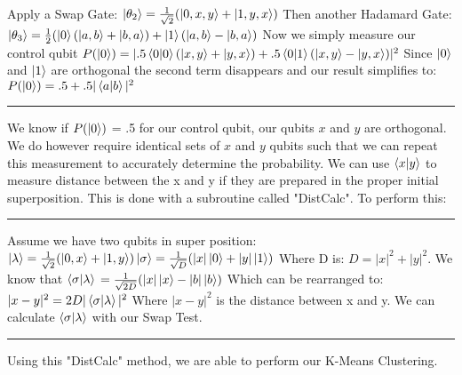 \documentclass[conference]{IEEEtran}
\begin{document}
   Apply a Swap Gate: \newline 
 $  \ket{\theta_2} = \frac{1}{\sqrt{2}}(\ket{0,x,y}+ \ket{1,y,x}) $ \newline \newline
   Then another Hadamard Gate: \newline 
 $  \ket{\theta_3} = \frac{1}{2}(\ket{0}(\ket{a,b}+\ket{b,a}) + \ket{1}(\ket{a,b}-\ket{b,a}) $ \newline \newline
 Now we simply measure our control qubit \newline
 $P(\ket{0}) =|.5 \bra{0}\ket{0}(\ket{x,y} + \ket{y,x}) + .5\bra{0}\ket{1}(\ket{x,y}-\ket{y,x})|^2$  Since $\ket{0}$ and $\ket{1}$ are orthogonal the second term disappears and our result simplifies to: \newline
 $P(\ket{0}) = .5 + .5|\bra{a}\ket{b}|^2$ \newline
\noindent\rule{\columnwidth}{1pt}
\indent We know if $P(\ket{0})$ = .5 for our control qubit, our qubits $x$ and $y$ are orthogonal. We do however require identical sets of $x$ and $y$ qubits such that we can repeat this measurement to accurately determine the probability. We can use $\bra{x}\ket{y}$ to measure distance between the x and y if they are prepared in the proper initial superposition. This is done with a subroutine called "DistCalc". To perform this: 
\noindent\rule{\columnwidth}{1pt}
Assume we have two qubits in super position:
$
\ket{\lambda} = \frac{1}{\sqrt{2}}(\ket{0,x} + \ket{1,y}) \\
\ket{\sigma} = \frac{1}{\sqrt{D}}(|x|\ket{0} + |y|\ket{1})
$ \newline \newline
Where D is: $D = |x|^2+|y|^2$. \newline \newline 
We know that $\bra{\sigma}\ket{\lambda}$
$
 = \frac{1}{\sqrt{2D}}(|x|\ket{x} - |b|\ket{b})
$ \newline \newline
Which can be rearranged to: 
$
|x-y|^2 = 2D|\bra{\sigma}\ket{\lambda}|^2
$ \newline \newline
Where $|x-y|^2$ is the distance between x and y. We can calculate $\bra{\sigma}\ket{\lambda}$ with our Swap Test. 
\newline
\noindent\rule{\columnwidth}{1pt}
\newline
\indent Using this "DistCalc" method, we are able to perform our K-Means Clustering. \newline
\end{document}
